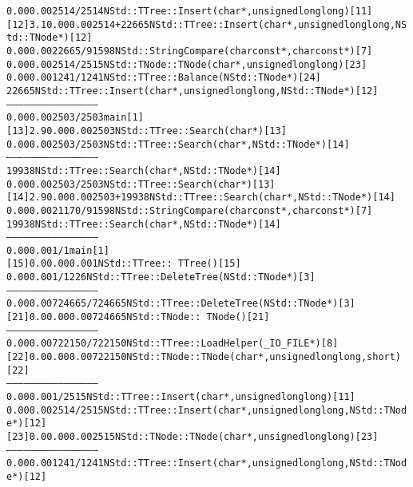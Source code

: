 \begin{alltt}
                0.00    0.00    2514/2514        NStd::TTree::Insert(char*, unsigned long long) [11]
[12]     3.1    0.00    0.00    2514+22665   NStd::TTree::Insert(char*, unsigned long long, NStd::TNode*) [12]
                0.00    0.00   22665/91598       NStd::StringCompare(char const*, char const*) [7]
                0.00    0.00    2514/2515        NStd::TNode::TNode(char*, unsigned long long) [23]
                0.00    0.00    1241/1241        NStd::TTree::Balance(NStd::TNode*) [24]
                               22665             NStd::TTree::Insert(char*, unsigned long long, NStd::TNode*) [12]
-----------------------------------------------
                0.00    0.00    2503/2503        main [1]
[13]     2.9    0.00    0.00    2503         NStd::TTree::Search(char*) [13]
                0.00    0.00    2503/2503        NStd::TTree::Search(char*, NStd::TNode*) [14]
-----------------------------------------------
                               19938             NStd::TTree::Search(char*, NStd::TNode*) [14]
                0.00    0.00    2503/2503        NStd::TTree::Search(char*) [13]
[14]     2.9    0.00    0.00    2503+19938   NStd::TTree::Search(char*, NStd::TNode*) [14]
                0.00    0.00   21170/91598       NStd::StringCompare(char const*, char const*) [7]
                               19938             NStd::TTree::Search(char*, NStd::TNode*) [14]
-----------------------------------------------
                0.00    0.00       1/1           main [1]
[15]     0.0    0.00    0.00       1         NStd::TTree::~TTree() [15]
                0.00    0.00       1/1226        NStd::TTree::DeleteTree(NStd::TNode*) [3]
-----------------------------------------------
                0.00    0.00  724665/724665      NStd::TTree::DeleteTree(NStd::TNode*) [3]
[21]     0.0    0.00    0.00  724665         NStd::TNode::~TNode() [21]
-----------------------------------------------
                0.00    0.00  722150/722150      NStd::TTree::LoadHelper(_IO_FILE*) [8]
[22]     0.0    0.00    0.00  722150         NStd::TNode::TNode(char*, unsigned long long, short) [22]
-----------------------------------------------
                0.00    0.00       1/2515        NStd::TTree::Insert(char*, unsigned long long) [11]
                0.00    0.00    2514/2515        NStd::TTree::Insert(char*, unsigned long long, NStd::TNode*) [12]
[23]     0.0    0.00    0.00    2515         NStd::TNode::TNode(char*, unsigned long long) [23]
-----------------------------------------------
                0.00    0.00    1241/1241        NStd::TTree::Insert(char*, unsigned long long, NStd::TNode*) [12]

\end{alltt}
